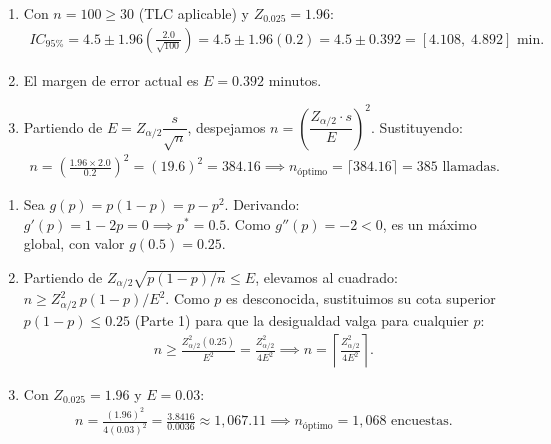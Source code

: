 \begin{solproblema}[prob:6af5954]
	\begin{enumerate}
		\item Con $n=100\ge30$ (TLC aplicable) y $Z_{0.025}=1.96$:
		\begin{align}
			IC_{95\%} = 4.5 \pm 1.96\left(\frac{2.0}{\sqrt{100}}\right) = 4.5 \pm 1.96(0.2) = 4.5 \pm 0.392 = [4.108,\;4.892] \text{ min.}
		\end{align}
		\item El margen de error actual es $E=0.392$ minutos.
		\item Partiendo de $E=Z_{\alpha/2}\dfrac{s}{\sqrt{n}}$, despejamos $n=\left(\dfrac{Z_{\alpha/2}\cdot s}{E}\right)^2$. Sustituyendo:
		\begin{align}
			n = \left(\frac{1.96\times2.0}{0.2}\right)^2 = (19.6)^2 = 384.16 \implies n_{\text{óptimo}} = \lceil384.16\rceil = 385 \text{ llamadas.}
		\end{align}
	\end{enumerate}
\end{solproblema}

\begin{solproblema}[prob:0257f5f]
	\begin{enumerate}
		\item Sea $g(p)=p(1-p)=p-p^2$. Derivando: $g'(p)=1-2p=0 \implies p^*=0.5$. Como $g''(p)=-2<0$, es un máximo global, con valor $g(0.5)=0.25$.
		\item Partiendo de $Z_{\alpha/2}\sqrt{p(1-p)/n}\le E$, elevamos al cuadrado: $n\ge Z_{\alpha/2}^2\,p(1-p)/E^2$. Como $p$ es desconocida, sustituimos su cota superior $p(1-p)\le0.25$ (Parte 1) para que la desigualdad valga para cualquier $p$:
		\begin{align}
			n \ge \frac{Z_{\alpha/2}^2(0.25)}{E^2} = \frac{Z_{\alpha/2}^2}{4E^2} \implies n = \left\lceil\frac{Z_{\alpha/2}^2}{4E^2}\right\rceil.
		\end{align}
		\item Con $Z_{0.025}=1.96$ y $E=0.03$:
		\begin{align}
			n = \frac{(1.96)^2}{4(0.03)^2} = \frac{3.8416}{0.0036} \approx 1{,}067.11 \implies n_{\text{óptimo}} = 1{,}068 \text{ encuestas.}
		\end{align}
	\end{enumerate}
\end{solproblema}

